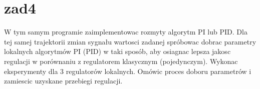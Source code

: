 \section{zad4}
\label{lab:zad4}

W tym samym programie zaimplementowac rozmyty algorytm PI lub PID. Dla tej samej
trajektorii zmian sygnału wartosci zadanej spróbowac dobrac parametry lokalnych
algorytmów PI (PID) w taki sposób, aby osiagnac lepsza jakosc regulacji w porównaniu
z regulatorem klasycznym (pojedynczym). Wykonac eksperymenty dla 3 regulatorów
lokalnych. Omówic proces doboru parametrów i zamiescic uzyskane przebiegi regulacji.

%    



\newpage
